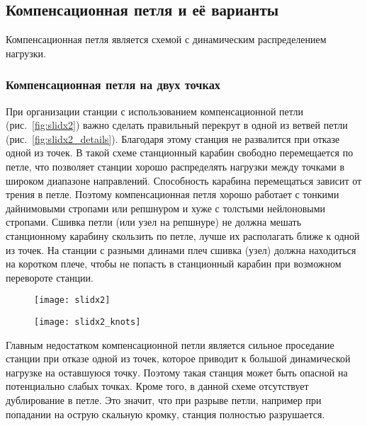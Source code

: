 \documentclass[fleqn, 12pt]{extarticle}
\begin{document}
\subsection{Компенсационная петля и её варианты}
    Компенсационная петля является схемой с динамическим распределением нагрузки.
    
    \subsubsection{Компенсационная петля на двух точках}
    При организации станции с использованием компенсационной петли (рис.~\ref{fig:slidx2}) важно сделать правильный перекрут в одной из ветвей петли (рис.~\ref{fig:slidx2_details}).
    Благодаря этому станция не развалится при отказе одной из точек. В такой схеме станционный карабин свободно перемещается по петле, что позволяет станции хорошо распределять
    нагрузки между точками в широком диапазоне направлений.
    Способность карабина перемещаться зависит от трения в петле. Поэтому компенсационная петля хорошо работает с тонкими дайнимовыми стропами или репшнуром и хуже
    с толстыми нейлоновыми стропами. Сшивка петли (или узел на репшнуре) не должна мешать станционному карабину скользить по петле, лучше их располагать ближе к одной из точек.
    На станции с разными длинами плеч сшивка (узел) должна находиться на коротком плече, чтобы не попасть в станционный карабин при возможном перевороте станции.
    \begin{figure}
        \centering
        \begin{minipage}[t]{0.45\textwidth}
            \texttt{[image: slidx2]}
            \label{fig:slidx2}
        \end{minipage}\hspace{0.05\textwidth}
        \begin{minipage}[t]{0.45\textwidth}
            \texttt{[image: slidx2\_knots]}
            \label{fig:slidx2_knots}
        \end{minipage}
    \end{figure}
    
	Главным недостатком компенсационной петли является сильное проседание станции при отказе одной из точек, которое приводит к большой динамической нагрузке на оставшуюся точку.
    Поэтому такая станция может быть опасной на потенциально слабых точках. Кроме того, в данной схеме отсутствует дублирование в петле. Это значит, что при разрыве петли, например
    при попадании на острую скальную кромку, станция полностью разрушается.
    
\end{document}

